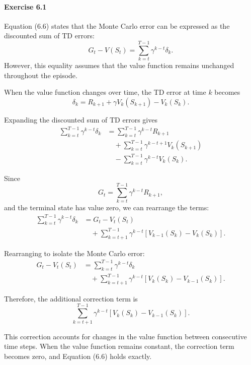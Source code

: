 \documentclass{article}
\begin{document}
\paragraph{Exercise 6.1}
Equation (6.6) states that the Monte Carlo error can be expressed as the
discounted sum of TD errors:
\[
G_t - V(S_t)
= \sum_{k=t}^{T-1} \gamma^{k-t}\delta_k.
\]
However, this equality assumes that the value function remains unchanged
throughout the episode.

When the value function changes over time, the TD error at time $k$ becomes
\[
\delta_k
= R_{k+1} + \gamma V_k(S_{k+1}) - V_k(S_k).
\]

Expanding the discounted sum of TD errors gives
\begin{align*}
\sum_{k=t}^{T-1}\gamma^{k-t}\delta_k
&= \sum_{k=t}^{T-1}\gamma^{k-t}R_{k+1} \\
&\quad + \sum_{k=t}^{T-1}
    \gamma^{k-t+1}V_k(S_{k+1}) \\
&\quad - \sum_{k=t}^{T-1}
    \gamma^{k-t}V_k(S_k).
\end{align*}

Since
\[
G_t = \sum_{k=t}^{T-1}\gamma^{k-t}R_{k+1},
\]
and the terminal state has value zero, we can rearrange the terms:
\begin{align*}
\sum_{k=t}^{T-1}\gamma^{k-t}\delta_k
&= G_t - V_t(S_t) \\
&\quad + \sum_{k=t+1}^{T-1}\gamma^{k-t}
\left[V_{k-1}(S_k)-V_k(S_k)\right].
\end{align*}

Rearranging to isolate the Monte Carlo error:
\[
{
\begin{aligned}
G_t - V_t(S_t)
&= \sum_{k=t}^{T-1}\gamma^{k-t}\delta_k \\
&\quad + \sum_{k=t+1}^{T-1}\gamma^{k-t}
\left[V_k(S_k)-V_{k-1}(S_k)\right].
\end{aligned}
}
\]

Therefore, the additional correction term is
\[
\boxed{
\sum_{k=t+1}^{T-1}\gamma^{k-t}
\left[V_k(S_k)-V_{k-1}(S_k)\right].
}
\]

This correction accounts for changes in the value function between consecutive
time steps. When the value function remains constant, the correction term
becomes zero, and Equation (6.6) holds exactly.
\end{document}
